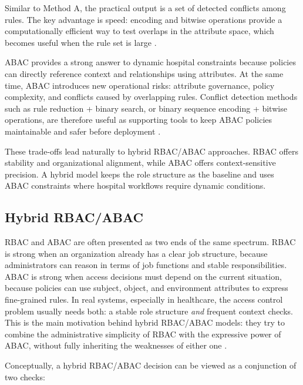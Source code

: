 Similar to Method A, the practical output is a set of detected conflicts among rules. The key advantage is speed: encoding and bitwise operations provide a computationally efficient way to test overlaps in the attribute space, which becomes useful when the rule set is large \cite{Zheng2019ABAC}.
\vspace{0.5cm}


ABAC provides a strong answer to dynamic hospital constraints because policies can directly reference context and relationships using attributes. At the same time, ABAC introduces new operational risks: attribute governance, policy complexity, and conflicts caused by overlapping rules. Conflict detection methods such as rule reduction + binary search, or binary sequence encoding + bitwise operations, are therefore useful as supporting tools to keep ABAC policies maintainable and safer before deployment \cite{ Zheng2019ABAC}.
\vspace{0.5cm}


These trade-offs lead naturally to hybrid RBAC/ABAC approaches. RBAC offers stability and organizational alignment, while ABAC offers context-sensitive precision. A hybrid model keeps the role structure as the baseline and uses ABAC constraints where hospital workflows require dynamic conditions.


\subsection{Hybrid RBAC/ABAC}
\label{sec:hybrid-rbac-abac}

RBAC and ABAC are often presented as two ends of the same spectrum. RBAC is strong when an organization already has a clear job structure, because administrators can reason in terms of job functions and stable responsibilities. ABAC is strong when access decisions must depend on the current situation, because policies can use subject, object, and environment attributes to express fine-grained rules. In real systems, especially in healthcare, the access control problem usually needs both: a stable role structure \emph{and} frequent context checks. This is the main motivation behind hybrid RBAC/ABAC models: they try to combine the administrative simplicity of RBAC with the expressive power of ABAC, without fully inheriting the weaknesses of either one \cite{KuhnCoyneWeil2010,Penelova2021HRABAC}.
\vspace{0.5cm}


Conceptually, a hybrid RBAC/ABAC decision can be viewed as a conjunction of two checks:

